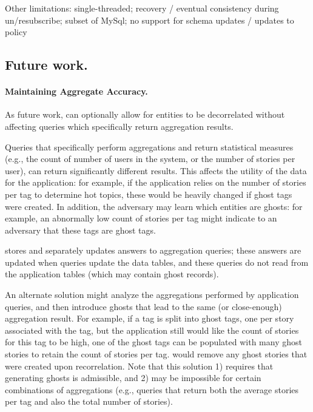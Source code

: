 Other limitations:
single-threaded;
recovery / eventual consistency during un/resubscribe;
subset of MySql;
no support for schema updates / updates to policy

\subsection{Future work.}
\paragraph{Maintaining Aggregate Accuracy.}
As future work, \sys can optionally allow for entities to be decorrelated without affecting queries which
specifically return aggregation results.

Queries that specifically perform aggregations and return statistical measures (e.g.,
the count of number of users in the system, or the number of stories per user), can return
significantly different results. This affects the utility of the data for the application: for
example, if the application relies on the number of stories per tag to determine hot topics, these
would be heavily changed if ghost tags were created.  In addition, the adversary may learn which
entities are ghosts: for example, an abnormally low count of stories per tag might indicate to an
adversary that these tags are ghost tags.  

\sys stores and separately updates answers to aggregation queries;
these answers are updated when queries update the data tables, and these queries do not read from
the application tables (which may contain ghost records).

An alternate solution might analyze the aggregations performed by application queries, and then
introduce ghosts that lead to the same (or close-enough) aggregation result. For example, if a tag
is split into ghost tags, one per story associated with the tag, but the application still would
like the count of stories for this tag to be high, one of the ghost tags can be populated with many
ghost stories to retain the count of stories per tag.  \sys would remove any ghost stories that
were created upon recorrelation. Note that this solution 1) requires that generating ghosts is
admissible, and 2) may be impossible for certain combinations of aggregations (e.g., queries that
return both the average stories per tag and also the total number of stories).


\fi
